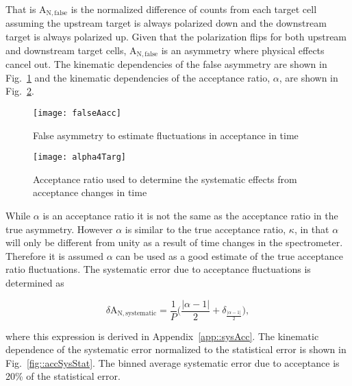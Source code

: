 \noindent
That is A$_{\mathrm{N,false}}$ is the normalized difference of counts from each
target cell assuming the upstream target is always polarized down and the
downstream target is always polarized up.  Given that the polarization flips for
both upstream and downstream target cells, A$_{\mathrm{N,false}}$ is an
asymmetry where physical effects cancel out.  The kinematic dependencies of the
false asymmetry are shown in Fig.~\ref{fig::falseAacc} and the kinematic
dependencies of the acceptance ratio, $\alpha$, are shown in
Fig.~\ref{fig::alpha}.

\begin{figure}[h!t]
  \begin{center}
    \texttt{[image: falseAacc]}
    \caption{False asymmetry to estimate fluctuations in acceptance in time}
    \label{fig::falseAacc}
  \end{center}
\end{figure}

\begin{figure}[h!t]
  \begin{center}
    \texttt{[image: alpha4Targ]}
    \caption{Acceptance ratio used to determine the systematic effects from
      acceptance changes in time}
    \label{fig::alpha}
  \end{center}
\end{figure}

While $\alpha$ is an acceptance ratio it is not the same as the acceptance ratio
in the true asymmetry.  However $\alpha$ is similar to the true acceptance
ratio, $\kappa$, in that $\alpha$ will only be different from unity as a result
of time changes in the spectrometer.  Therefore it is assumed $\alpha$ can be
used as a good estimate of the true acceptance ratio fluctuations.  The
systematic error due to acceptance fluctuations is determined as

\begin{equation}
  \delta\mathrm{A}_{\mathrm{N,systematic}} =
  \frac{1}{P} \Big(\frac{|\alpha-1|}{2} + \delta_{\frac{|\alpha-1|}{2}} \Big),
\end{equation}

\noindent
where this expression is derived in Appendix~\ref{app::sysAcc}.  The kinematic
dependence of the systematic error normalized to the statistical error is shown
in Fig.~\ref{fig::accSysStat}.  The binned average systematic error due to
acceptance is 20\% of the statistical error.

